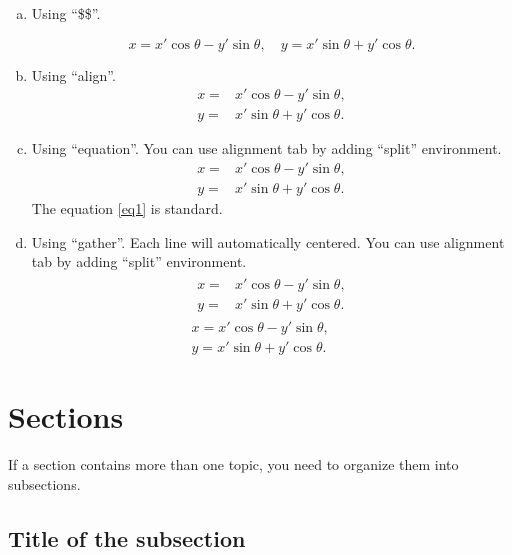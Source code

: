 \documentclass[12pt]{article}
\theoremstyle{definition}
\numberwithin{equation}{section}
\begin{document}
\begin{enumerate}[(a)]
\item Using “\$\$”.

$$x=x'\cos\theta-y'\sin\theta,\quad
y=x'\sin\theta+y'\cos\theta.$$

\item Using “align”.
\begin{align*} 
x=&x'\cos\theta-y'\sin\theta,\\
y=&x'\sin\theta+y'\cos\theta.\end{align*}



\item Using “equation”. You can use alignment tab by adding “split” environment. 
\begin{equation}\label{eq1}
\begin{split}x=&x'\cos\theta-y'\sin\theta,\\
y=&x'\sin\theta+y'\cos\theta.
\end{split}
\end{equation}The equation \eqref{eq1} is standard.


\item Using “gather”. Each line will automatically centered. You can use alignment tab by adding “split” environment. 
\begin{gather*}
\begin{split}x=&x'\cos\theta-y'\sin\theta,\\
y=&x'\sin\theta+y'\cos\theta.
\end{split}\\
x=x'\cos\theta-y'\sin\theta,\\
y=x'\sin\theta+y'\cos\theta.
\end{gather*}

 
\end{enumerate}
 
 \vfill\pagebreak %
\section{Sections}

If a section contains more than one topic, you need to organize them into   subsections.

 

\subsection{Title of the subsection}
\end{document}
